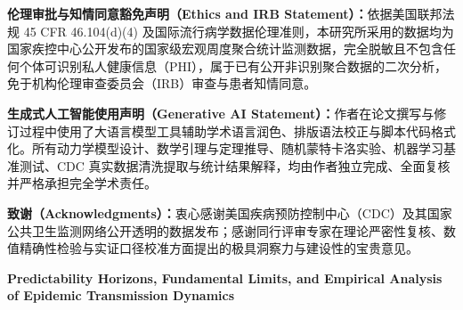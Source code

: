 \documentclass[11pt,a4paper]{article}
\theoremstyle{plain}
\theoremstyle{definition}
\begin{document}
\vspace{0.4em}
\noindent\textbf{伦理审批与知情同意豁免声明（Ethics and IRB Statement）：}依据美国联邦法规 45 CFR 46.104(d)(4) 及国际流行病学数据伦理准则，本研究所采用的数据均为国家疾控中心公开发布的国家级宏观周度聚合统计监测数据，完全脱敏且不包含任何个体可识别私人健康信息（PHI），属于已有公开非识别聚合数据的二次分析，免于机构伦理审查委员会（IRB）审查与患者知情同意。

\vspace{0.4em}
\noindent\textbf{生成式人工智能使用声明（Generative AI Statement）：}作者在论文撰写与修订过程中使用了大语言模型工具辅助学术语言润色、排版语法校正与脚本代码格式化。所有动力学模型设计、数学引理与定理推导、随机蒙特卡洛实验、机器学习基准测试、CDC 真实数据清洗提取与统计结果解释，均由作者独立完成、全面复核并严格承担完全学术责任。

\vspace{0.4em}
\noindent\textbf{致谢（Acknowledgments）：}衷心感谢美国疾病预防控制中心（CDC）及其国家公共卫生监测网络公开透明的数据发布；感谢同行评审专家在理论严密性复核、数值精确性检验与实证口径校准方面提出的极具洞察力与建设性的宝贵意见。

\vspace{1.5em}
\begin{center}
    {\heiti\bfseries Predictability Horizons, Fundamental Limits, and Empirical Analysis of Epidemic Transmission Dynamics} \\[1.0em]
\end{center}
\end{document}
